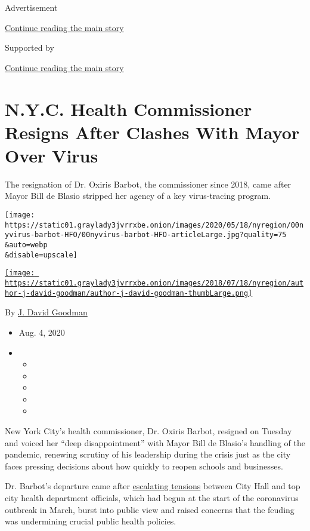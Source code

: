 Advertisement

\protect\hyperlink{after-top}{Continue reading the main story}

Supported by

\protect\hyperlink{after-sponsor}{Continue reading the main story}

\hypertarget{nyc-health-commissioner-resigns-after-clashes-with-mayor-over-virus}{%
\section{N.Y.C. Health Commissioner Resigns After Clashes With Mayor
Over
Virus}\label{nyc-health-commissioner-resigns-after-clashes-with-mayor-over-virus}}

The resignation of Dr. Oxiris Barbot, the commissioner since 2018, came
after Mayor Bill de Blasio stripped her agency of a key virus-tracing
program.

\texttt{[image: https://static01.graylady3jvrrxbe.onion/images/2020/05/18/nyregion/00nyvirus-barbot-HFO/00nyvirus-barbot-HFO-articleLarge.jpg?quality=75\\\&auto=webp\\\&disable=upscale]}

\href{https://www.nytimes3xbfgragh.onion/by/j-david-goodman}{\texttt{[image: https://static01.graylady3jvrrxbe.onion/images/2018/07/18/nyregion/author-j-david-goodman/author-j-david-goodman-thumbLarge.png]}}

By \href{https://www.nytimes3xbfgragh.onion/by/j-david-goodman}{J. David
Goodman}

\begin{itemize}
\item
  Aug. 4, 2020
\item
  \begin{itemize}
  \item
  \item
  \item
  \item
  \item
  \end{itemize}
\end{itemize}

New York City's health commissioner, Dr. Oxiris Barbot, resigned on
Tuesday and voiced her ``deep disappointment'' with Mayor Bill de
Blasio's handling of the pandemic, renewing scrutiny of his leadership
during the crisis just as the city faces pressing decisions about how
quickly to reopen schools and businesses.

Dr. Barbot's departure came after
\href{https://www.nytimes3xbfgragh.onion/2020/05/14/nyregion/coronavirus-de-blasio-mitchell-katz.html}{escalating
tensions} between City Hall and top city health department officials,
which had begun at the start of the coronavirus outbreak in March, burst
into public view and raised concerns that the feuding was undermining
crucial public health policies.

